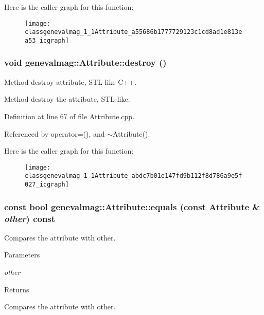 Here is the caller graph for this function:\nopagebreak
\begin{figure}[H]
\begin{center}
\leavevmode
\texttt{[image: classgenevalmag\_1\_1Attribute\_a55686b1777729123c1cd8ad1e813ea53\_icgraph]}
\end{center}
\end{figure}


\hypertarget{classgenevalmag_1_1Attribute_abdc7b01e147fd9b112f8d786a9e5f027}{
\subsubsection[{destroy}]{\setlength{\rightskip}{0pt plus 5cm}void genevalmag::Attribute::destroy ()}}
\label{classgenevalmag_1_1Attribute_abdc7b01e147fd9b112f8d786a9e5f027}
Method destroy attribute, STL-\/like C++.

Method destroy the attribute, STL-\/like. 

Definition at line 67 of file Attribute.cpp.



Referenced by operator=(), and $\sim$Attribute().



Here is the caller graph for this function:\nopagebreak
\begin{figure}[H]
\begin{center}
\leavevmode
\texttt{[image: classgenevalmag\_1\_1Attribute\_abdc7b01e147fd9b112f8d786a9e5f027\_icgraph]}
\end{center}
\end{figure}


\hypertarget{classgenevalmag_1_1Attribute_a1fa5839094c3ea82c49d1ee6319344ae}{
\subsubsection[{equals}]{\setlength{\rightskip}{0pt plus 5cm}const bool genevalmag::Attribute::equals (const {\bf Attribute} \& {\em other}) const}}
\label{classgenevalmag_1_1Attribute_a1fa5839094c3ea82c49d1ee6319344ae}
Compares the attribute with other. 
\begin{DoxyParams}{Parameters}
\item[{\em other}]\end{DoxyParams}
\begin{DoxyReturn}{Returns}

\end{DoxyReturn}
Compares the attribute with other. 

